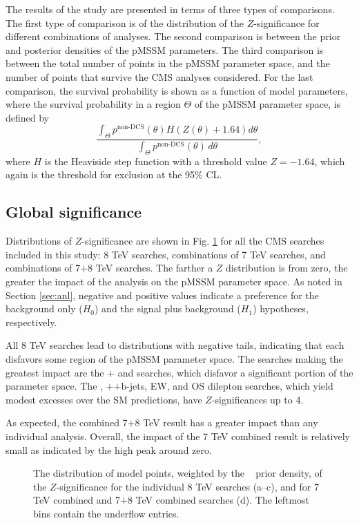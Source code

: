 The results of the study are presented in terms of three types of comparisons. The first type of comparison is of the distribution of the $Z$-significance for different combinations of analyses.
The second comparison is between the prior and posterior densities of the pMSSM parameters.
The third comparison is between the total number of points in the pMSSM parameter space, and the number of points that survive the CMS analyses considered. For the last comparison, the survival probability is shown as a function of model parameters, where the survival probability in a region $\Theta$ of the pMSSM parameter space, is defined by
\begin{equation}
  \frac{\int_\Theta p^\textrm{non-DCS}(\theta)H(Z(\theta) + 1.64)d\theta}{\int_\Theta p^\textrm{non-DCS}(\theta) \, d\theta},
  \label{eq:Survive}
\end{equation}
where $H$ is the Heaviside step function with a threshold value $Z = -1.64$, which
again is the threshold for exclusion at the 95\% CL. 

\subsection{Global significance}
Distributions of $Z$-significance are shown in Fig. \ref{fig:Z} for all the CMS
searches included in this study: 8 TeV searches, combinations of 7 TeV searches, and combinations of
7$+$8 TeV searches. The farther a $Z$ distribution is from zero, the
greater the impact of the analysis on the pMSSM parameter space.   As
noted in Section \ref{sec:anl}, negative and positive values indicate a preference for the background only ($H_0$) and the signal plus background ($H_1$) hypotheses, respectively.

All 8 TeV searches lead to distributions with negative tails,
indicating that each disfavors some region of the pMSSM parameter space.
The searches making the greatest impact are the \HT{}$+$\MHT{} and \MTtwo{}
searches, which disfavor a significant portion of the parameter space.
The \MTtwo{}, \HT{}$+$\MET{}$+$b-jets, EW, and OS dilepton searches,
which yield modest excesses over the SM predictions, have
$Z$-significances up to 4.

As expected, the combined 7$+$8 TeV result has a greater impact than any individual analysis. 
Overall, the impact of the 7 TeV combined result is relatively small as indicated by the high peak around zero. 


\begin{figure}[t]
\centering
{}
\vspace{1mm}
\caption{The distribution of model points, weighted by the \preCMS~ prior density, of the $Z$-significance for the individual 8 TeV searches (a--c), and for 7 TeV combined and 7$+$8 TeV combined searches (d). The leftmost bins contain the underflow entries.}
\label{fig:Z}
\end{figure}
